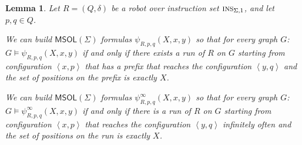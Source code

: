 \documentclass{aamas2015}
\newtheorem{lem}{Lemma}
\newcommand{\tpl}[1]{\left<{#1}\right>}
\def\ins{\textsc{ins}}
\def\msol{\mathsf{MSOL}}
\begin{document}
%
\begin{lem} \label{lem:msodefinable}
Let $R = (Q,\delta)$ be a robot over instruction set $\ins_{\Sigma,1}$, and let ${p}, {q} \in Q$.

We can build $\msol(\Sigma)$ formulas $\psi_{{R},{p},{q}}(X,x,y)$ so that for every graph $G$:
$G \models \psi_{{R},{p},{q}}({X},{x},{y})$ if and only if there exists a run of ${R}$ on $G$ starting from configuration $\tpl{{x},{p}}$ that has a prefix that reaches the configuration $\tpl{{y},{q}}$ and the set of positions on the prefix is exactly $X$.

We can build $\msol(\Sigma)$ formulas $\psi^\infty_{{R},{p},{q}}(X,x,y)$ so that for every graph $G$: $G \models \psi^\infty_{{R},{p},{q}}({X},{x},{y})$ if and only if there is a run of ${R}$ on $G$ starting from configuration $\tpl{{x},{p}}$ that reaches the configuration $\tpl{{y},{q}}$ infinitely often and the set of positions on the run is exactly $X$.
\end{lem}
%
\end{document}
